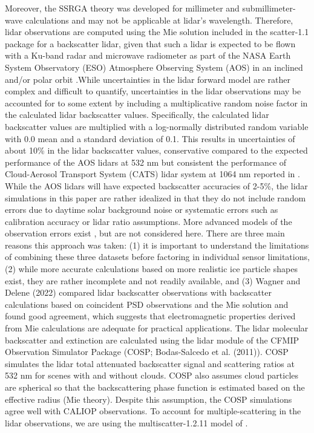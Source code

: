 \documentclass{ametsocV6.1}
\begin{document}
Moreover, the SSRGA theory was developed for millimeter and submillimeter-wave calculations and may not be applicable at lidar's wavelength. Therefore, lidar observations are computed using the Mie solution included in the scatter-1.1 package for a backscatter lidar, given that such a lidar is expected to be flown with a Ku-band radar and microwave radiometer as part of the NASA Earth System Observatory (ESO) Atmosphere Observing System (AOS) in an inclined and/or polar orbit \citep{yorks2022}.While uncertainties in the lidar forward model are rather complex and difficult to quantify, uncertainties in the lidar observations may be accounted for to some extent by including a multiplicative random noise factor in the calculated lidar backscatter values. Specifically, the calculated lidar backscatter values are multiplied with a log-normally distributed random variable with 0.0 mean and a standard deviation of 0.1. This results in uncertainties of about 10\% in the lidar backscatter values, conservative compared to the expected performance of the AOS lidars at 532 nm but consistent the performance of Cloud-Aerosol Transport System (CATS) lidar system at 1064 nm reported in \citep{pauly2019}. While the AOS lidars will have expected backscatter accuracies of 2-5\%, the lidar simulations in this paper are rather idealized in that they do not include random errors due to daytime solar background noise or systematic errors such as calibration accuracy or lidar ratio assumptions. More advanced models of the observation errors exist \citep{liu2006}, but are not considered here. There are three main reasons this approach was taken: (1) it is important to understand the limitations of combining these three datasets before factoring in individual sensor limitations, (2) while more accurate calculations based on more realistic ice particle shapes exist, they are rather incomplete and not readily available, and (3) Wagner and Delene (2022) compared lidar backscatter observations with backscatter calculations based on coincident PSD observations and the Mie solution and found good agreement, which suggests that electromagnetic properties derived from Mie calculations are adequate for practical applications. The lidar molecular backscatter and extinction are calculated using the lidar module of the CFMIP Observation Simulator Package (COSP; Bodas-Salcedo et al. (2011)). COSP simulates the lidar total attenuated backscatter signal and scattering ratios at 532 nm for scenes with and without clouds. COSP also assumes cloud particles are spherical so that the backscattering phase function is estimated based on the effective radius (Mie theory). Despite this assumption, the COSP simulations agree well with CALIOP observations. To account for multiple-scattering in the lidar observations, we are using the multiscatter-1.2.11 model \citep{multiscatter-1.2.11} of \cite{hogan2008lidar_ms}. 
\end{document}
